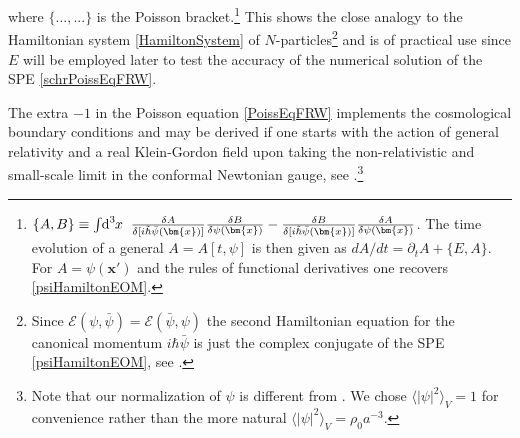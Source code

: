 \documentclass[twocolumn, nofootinbib, showpacs, superscriptaddress]{revtex4-1}
\newcommand{\thbar}{\tilde\hbar}
\newcommand{\vol}[2]{\hspace{-0.8mm}\mbox{$\text{d}^{\hspace{-0.0mm}#1}$}\hspace{-0.2mm}#2\hspace{0.8mm}\ }
\newcommand{\vx}[0]{\bm{x} }
\begin{document}
 where $\{...,...\}$ is the Poisson bracket.\footnote{$\{A , B\} \equiv \int \vol{3}{x} \frac{\delta A}{\delta[i \thbar \bar \psi(\vx)]} \frac{\delta B}{\delta \psi(\vx) } -  \frac{\delta B}{\delta[i \thbar \bar \psi(\vx)]}  \frac{\delta A}{\delta \psi(\vx) }$.  
The time evolution of a general $A=A[t,\psi]$ is then given as $dA/dt = \partial_t A + \{E, A\}$. For $A=\psi(\vx')$ and the rules of functional derivatives one recovers \eqref{psiHamiltonEOM}.} 
This shows the close analogy to the  Hamiltonian system \eqref{HamiltonSystem} of $N$-particles\footnote{Since $\mathcal{E}(\psi, \bar \psi) = \mathcal{E}(\bar \psi, \psi)$ the second Hamiltonian equation for the canonical momentum $i \hbar \bar \psi$ is just the complex conjugate of the SPE \eqref{psiHamiltonEOM}, see \cite{AS01}.} and is of practical use since $E$ will be employed later to test the  accuracy of the numerical solution of the SPE \eqref{schrPoissEqFRW}.

The extra $-1$ in the Poisson equation \eqref{PoissEqFRW} implements the cosmological boundary conditions and may be derived 
if one starts with the action of general relativity and a real Klein-Gordon field upon taking the non-relativistic and small-scale limit
 in the conformal Newtonian gauge, see \cite{SuarezChavanis2015}.\footnote{Note that our normalization of $\psi$ is different from \cite{SuarezChavanis2015}. We chose $\langle |\psi|^2\rangle_{V}=1$ for convenience rather than the more natural $\langle |\psi|^2\rangle_{V}= \rho_0 a^{-3}$.} 
\end{document}
